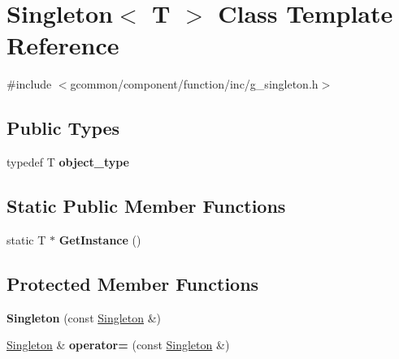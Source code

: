 \hypertarget{class_singleton}{\section{Singleton$<$ T $>$ Class Template Reference}
\label{class_singleton}
}


{\ttfamily \#include $<$gcommon/component/function/inc/g\-\_\-singleton.\-h$>$}

\subsection*{Public Types}
\begin{DoxyCompactItemize}
\item 
\hypertarget{class_singleton_ad326148a1526a06a30fb8337e7f9e6ca}{typedef T {\bfseries object\-\_\-type}}\label{class_singleton_ad326148a1526a06a30fb8337e7f9e6ca}

\end{DoxyCompactItemize}
\subsection*{Static Public Member Functions}
\begin{DoxyCompactItemize}
\item 
\hypertarget{class_singleton_aa3e375e30b25a0443eaacbfb4078ccbd}{static T $\ast$ {\bfseries Get\-Instance} ()}\label{class_singleton_aa3e375e30b25a0443eaacbfb4078ccbd}

\end{DoxyCompactItemize}
\subsection*{Protected Member Functions}
\begin{DoxyCompactItemize}
\item 
\hypertarget{class_singleton_a363d3f7d5276e6ee74966d9606df2086}{{\bfseries Singleton} (const \hyperlink{class_singleton}{Singleton} \&)}\label{class_singleton_a363d3f7d5276e6ee74966d9606df2086}

\item 
\hypertarget{class_singleton_a90761b9486d76162ab59c871b5cc030f}{\hyperlink{class_singleton}{Singleton} \& {\bfseries operator=} (const \hyperlink{class_singleton}{Singleton} \&)}\label{class_singleton_a90761b9486d76162ab59c871b5cc030f}

\end{DoxyCompactItemize}


